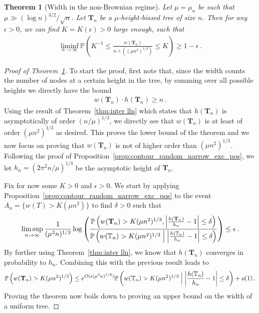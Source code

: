 \documentclass[10pt,a4paper]{amsart}
\newtheorem{theorem}{Theorem}
\newcommand{\CProb}[2]{\pr\left(#1 \Bigm| #2\right)}	%
\newcommand{\Prob}[1]{\pr\left(#1\right)}					%
\newcommand{\T}{\mathbb T}
\newcommand{\bT}{\mathbf T}
\newcommand{\eps}{\epsilon}
\newcommand{\pr}{\mathbb{P}}								%
\begin{document}
\begin{theorem}[Width in the non-Brownian regime]\label{thm:width}
Let $\mu=\mu_n$ be such that $\mu\gg (\log n)^{3/2}/\sqrt{n}$.
Let $\mathbf{T}_n$ be a $\mu$-height-biased tree of size $n$.
Then for any $\eps>0$, we can find $K=K(\eps)>0$ large enough, such that
        \begin{align*}
            \liminf_{n \to \infty} \Prob{K^{-1}\leq\frac{w(\mathbf{T}_n)}{n\wedge\left((\mu n^2)^{1/3}\right)}\leq K}\geq 1-\eps\,.
        \end{align*}
\end{theorem}

\begin{proof}[Proof of Theorem~\ref{thm:width}]
    To start the proof, first note that, since the width counts the number of nodes at a certain height in the tree, by summing over all possible heights we directly have the bound
    \begin{align*}
        w(\bT_n)\cdot h(\bT_n)\geq n\,.
    \end{align*}
    Using the result of Theorem~\ref{thm:inter lln} which states that $h(\bT_n)$ is asymptotically of order $(n/\mu)^{1/3}$, we directly see that $w(\bT_n)$ is at least of order $(\mu n^2)^{1/3}$ as desired.
    This proves the lower bound of the theorem and we now focus on proving that $w(\bT_n)$ is not of higher order than $(\mu n^2)^{1/3}$.
    Following the proof of Proposition~\ref{prop:contour_random_narrow_exc_pos}, we let $h_n=(2\pi^2n/\mu)^{1/3}$ be the asymptotic height of $\bT_n$.

    Fix for now some $K>0$ and $\epsilon>0$.
    We start by applying Proposition~\ref{prop:contour_random_narrow_exc_pos} to the event $A_n=\{w(T)>K(\mu n^2)^{}\}$ to find $\delta>0$ such that
    \begin{align*}
        \limsup_{n\rightarrow\infty}\frac{1}{(\mu^2n)^{1/3}}\log\left(\frac{\Prob{w(\bT_n)>K(\mu n^2)^{1/3},\left|\frac{h(\bT_n)}{h_n}-1\right|\leq\delta}}{\CProb{w(\T_n)>K(\mu n^2)^{1/3}}{\left|\frac{h(\T_n)}{h_n}-1\right|\leq\delta}}\right)\leq\epsilon\,.
    \end{align*}
    By further using Theorem~\ref{thm:inter lln}, we know that $h(\bT_n)$ converges in probability to $h_n$.
    Combining this with the previous result leads to
    \begin{align}\label{eq:bound width}
        \Prob{\Big.w(\bT_n)>K(\mu n^2)^{1/3}}\leq e^{O(\epsilon(\mu^2n)^{1/3})}\CProb{w(\T_n)>K(\mu n^2)^{1/3}}{\left|\frac{h(\T_n)}{h_n}-1\right|\leq\delta}+o(1)\,.
    \end{align}
    Proving the theorem now boils down to proving an upper bound on the width of a uniform tree.


\end{proof}
\end{document}
